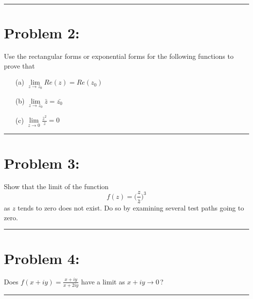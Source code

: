 \documentclass{article}
\begin{document}
\hrule %

\newpage
\section*{Problem 2: }
Use the rectangular forms or exponential forms for the following functions to prove that
		\begin{enumerate}
			\item[(a)]  $\lim\limits_{z\to z_0} Re(z) = Re(z_0)$
			\item[(b)] $\lim\limits_{z\to z_0} \bar{z} = \bar{z_0} $
			\item[(c)] $\lim\limits_{z\to 0} \frac{\bar{z}^2}{z} = 0$
		\end{enumerate}


\vspace{.5cm} %

\hrule

\newpage
\section*{Problem 3: }
Show that the limit of the function 
		\[ f(z) =\Big( \frac{z}{\bar{z}} \Big)^3\]
		as $z$ tends to zero does not exist. Do so by examining several test paths going to zero.
		
\vspace{.5cm} %

\hrule

\newpage
\section*{Problem 4: }
Does $f(x+iy)=\displaystyle{\frac{x+iy}{x+2iy}}$ have a limit as $x+iy \to 0$\,?

\vspace{.5cm} %

\hrule
\end{document}
